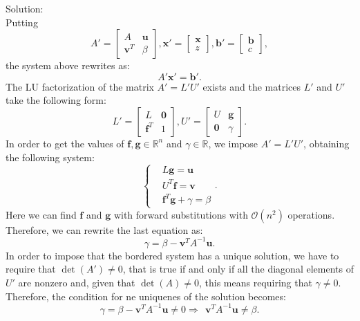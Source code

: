 \documentclass[a4paper]{report}
\newcommand{\R}{\mathbb{R}}
\numberwithin{equation}{chapter}
\begin{document}
\noindent Solution: \\
Putting 
\begin{equation}\label{key}
	A' = 
\begin{bmatrix}
	A &  \textbf{u} \\ 
	\textbf{v}^T & \beta 
\end{bmatrix}, 
\textbf{x}' = \begin{bmatrix}
	\textbf{x} \\ 
	z
\end{bmatrix}, 
\textbf{b}' = 
\begin{bmatrix}
	\textbf{b} \\ 
	c
\end{bmatrix},
\end{equation}
the system above rewrites as:
\begin{equation}\label{key}
	A' \textbf{x}' = \textbf{b}'.
\end{equation}
The LU factorization of the matrix $A' = L' U'$ exists and the matrices $L'$ and $U'$ take the following form:
\begin{equation}\label{key}
	L' = 
	\begin{bmatrix}
		L &  \textbf{0} \\ 
		\textbf{f}^T & 1 
	\end{bmatrix}, 	
U' = 
\begin{bmatrix}
U&  \textbf{g} \\ 
\textbf{0} & \gamma
\end{bmatrix}.
\end{equation}
In order to get the values of $\textbf{f}, \textbf{g}\in \R^n$ and $\gamma \in \R$, we impose $ A' = L' U'$, obtaining the following system:
\begin{equation}\label{key}
	\left\lbrace 
	\begin{split}
		& L\textbf{g} = \textbf{u}\\
		& U^T \textbf{f} = \textbf{v}\\
		&\textbf{f}^T \textbf{g} + \gamma = \beta
	\end{split} \right.  .
\end{equation}
Here we can find $\textbf{f}$ and $\textbf{g}$ with forward substitutions with $\mathcal{O}(n^2)$ operations. Therefore, we can rewrite the last equation as:
\begin{equation}\label{key}
	 \gamma = \beta - \textbf{v}^T A^{-1} \textbf{u} .
\end{equation}
In order to impose that the bordered system has a unique solution, we have to require that $\det(A') \neq 0$, that is true if and only if all the diagonal elements of $U'$ are nonzero and, given that $\det(A)\neq 0$, this means requiring that $\gamma \neq 0 $. Therefore, the condition for ne uniquenes of the solution becomes:
\begin{equation}\label{key}
	\gamma = \beta - \textbf{v}^T A^{-1} \textbf{u} \neq 0 \Rightarrow \ \ \textbf{v}^T A^{-1} \textbf{u} \neq \beta.
\end{equation}


	
\end{document}
